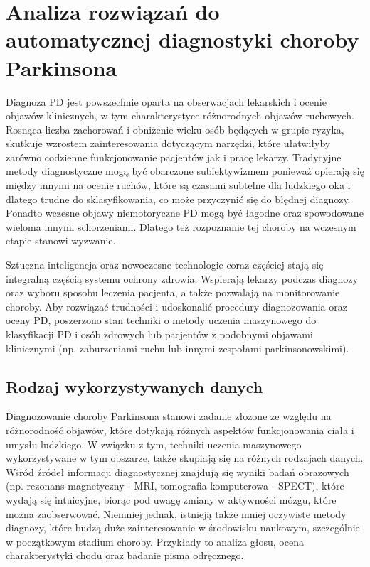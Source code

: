 \chapter{Analiza rozwiązań do automatycznej diagnostyki choroby Parkinsona}\label{ch:analiza-rozwiazan}


Diagnoza PD jest powszechnie oparta na obserwacjach lekarskich i ocenie objawów klinicznych, w tym charakterystyce różnorodnych objawów ruchowych.
Rosnąca liczba zachorowań i obniżenie wieku osób będących w grupie ryzyka, skutkuje wzrostem zainteresowania dotyczącym narzędzi, które ułatwiłyby
zarówno codzienne funkcjonowanie pacjentów jak i pracę lekarzy.
Tradycyjne metody diagnostyczne mogą być obarczone subiektywizmem ponieważ opierają się między innymi na ocenie ruchów, które są czasami subtelne dla
ludzkiego oka i dlatego trudne do sklasyfikowania, co może przyczynić się do błędnej diagnozy.
Ponadto wczesne objawy niemotoryczne PD mogą być łagodne oraz spowodowane wieloma innymi schorzeniami.
Dlatego też rozpoznanie tej choroby na wczesnym etapie stanowi wyzwanie.

Sztuczna inteligencja oraz nowoczesne technologie coraz częściej stają się integralną częścią systemu ochrony zdrowia.
Wspierają lekarzy podczas diagnozy oraz wyboru sposobu leczenia pacjenta, a także pozwalają na monitorowanie choroby.
Aby rozwiązać trudności i udoskonalić procedury diagnozowania oraz oceny PD, poszerzono stan techniki o metody uczenia maszynowego do
klasyfikacji PD i osób zdrowych lub pacjentów z podobnymi objawami klinicznymi (np. zaburzeniami ruchu lub innymi zespołami parkinsonowskimi).


\section{Rodzaj wykorzystywanych danych}\label{sec:dane-przeglad}

Diagnozowanie choroby Parkinsona stanowi zadanie złożone ze względu na różnorodność objawów, które dotykają różnych aspektów
funkcjonowania ciała i umysłu ludzkiego.
W związku z tym, techniki uczenia maszynowego wykorzystywane w tym obszarze, także skupiają się na różnych rodzajach danych.
Wśród źródeł informacji diagnostycznej znajdują się wyniki badań obrazowych (np. rezonans magnetyczny - MRI, tomografia komputerowa - SPECT),
które wydają się intuicyjne, biorąc pod uwagę zmiany w aktywności mózgu, które można zaobserwować.
Niemniej jednak, istnieją także mniej oczywiste metody diagnozy, które budzą duże zainteresowanie w środowisku naukowym, szczególnie w początkowym stadium choroby.
Przykłady to analiza głosu, ocena charakterystyki chodu oraz badanie pisma odręcznego.

